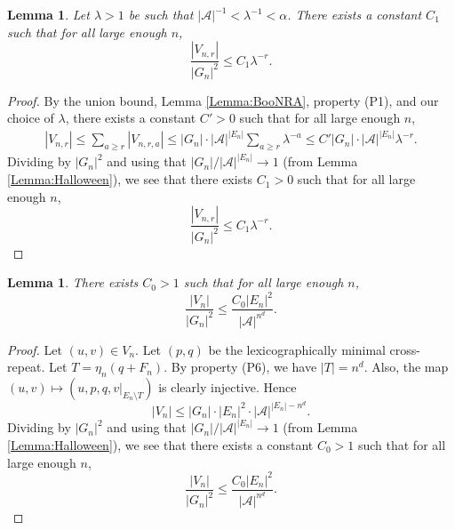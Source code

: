 \documentclass[12pt]{amsart}
\newtheorem{lemma}[theorem]{Lemma}
\theoremstyle{definition}
\begin{document}
\begin{lemma} \label{Lemma:NR}
Let $\lambda>1$ be such that $|\mathcal{A}|^{-1} < \lambda^{-1} < \alpha$.
There exists a constant $C_1$ such that for all large enough $n$,
\begin{equation*}
\frac{|V_{n,r}|}{|G_n|^2} \leq C_1 \lambda^{-r}.
\end{equation*}
\end{lemma}
\begin{proof}

By the union bound, Lemma \ref{Lemma:BooNRA}, property (P1), and our choice of $\lambda$, there exists a constant $C'>0$ such that for all large enough $n$,
\begin{align*}
|V_{n,r}| \leq \sum_{a \geq r} |V_{n,r,a}| \leq |G_n| \cdot |\mathcal{A}|^{|E_n|} \sum_{a \geq r} \lambda^{-a} \leq C' |G_n| \cdot |\mathcal{A}|^{|E_n|} \lambda^{-r}.
\end{align*}
Dividing by $|G_n|^2$ and using that $|G_n|/|\mathcal{A}|^{|E_n|} \to 1$ (from Lemma \ref{Lemma:Halloween}), we see that there exists $C_1>0$ such that for all large enough $n$, 
\begin{equation*}
\frac{|V_{n,r}|}{|G_n|^2} \leq C_1 \lambda^{-r}.
\end{equation*}
\end{proof}

\begin{lemma} \label{Lemma:Candy}
There exists $C_0>1$ such that for all large enough $n$,
\begin{equation*}
\frac{|V_n|}{|G_n|^2} \leq \frac{C_0 |E_n|^2}{ |\mathcal{A}|^{n^d}}.
\end{equation*}
\end{lemma}
\begin{proof}
Let $(u,v) \in V_n$. Let $(p,q)$ be the lexicographically minimal cross-repeat. %
Let $T = \eta_n(q+F_n)$. %
By property (P6), we have $|T| = n^d$. Also, the map $(u,v) \mapsto (u,p,q,v|_{E_n \setminus T})$ is clearly injective. Hence
\begin{equation*}
|V_n| \leq |G_n| \cdot |E_n|^2 \cdot |\mathcal{A}|^{|E_n| - n^d}.
\end{equation*}
Dividing by $|G_n|^2$ and using that $|G_n|/|\mathcal{A}|^{|E_n|} \to 1$ (from Lemma \ref{Lemma:Halloween}), we see that there exists a constant $C_0 >1$ such that for all large enough $n$,
\begin{equation*}
\frac{|V_n|}{|G_n|^2} \leq \frac{C_0 |E_n|^2}{ |\mathcal{A}|^{n^d}}.
\end{equation*}
\end{proof}
\end{document}
